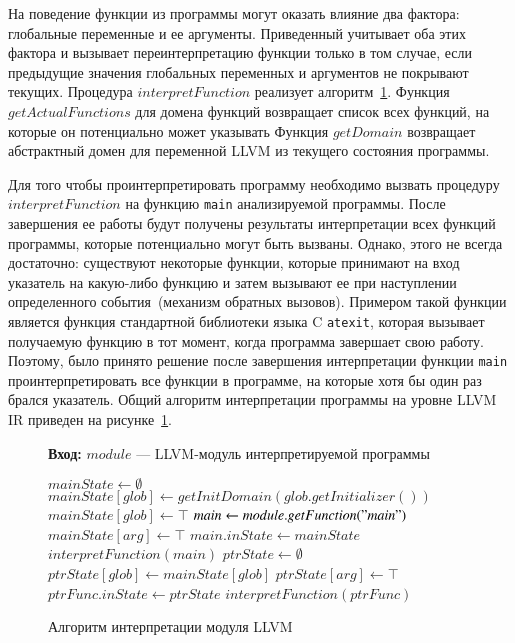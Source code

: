 На поведение функции из программы могут оказать влияние два фактора: 
глобальные переменные и ее аргументы. Приведенный учитывает оба этих фактора
и вызывает переинтерпретацию функции только в том случае, если предыдущие
значения глобальных переменных и аргументов не покрывают текущих. Процедура 
$interpretFunction$ реализует алгоритм~\ref{image:functionInterpretation}. 
Функция $getActualFunctions$ для домена функций возвращает список всех 
функций, на которые он потенциально может указывать Функция $getDomain$ 
возвращает абстрактный домен для переменной LLVM из текущего состояния 
программы.

Для того чтобы проинтерпретировать программу необходимо вызвать процедуру 
$interpretFunction$ на функцию \texttt{main} анализируемой программы. После 
завершения ее работы будут получены результаты интерпретации всех функций
программы, которые потенциально могут быть вызваны. Однако, этого не всегда
достаточно: существуют некоторые функции, которые принимают на вход указатель
на какую-либо функцию и затем вызывают ее при наступлении определенного 
события~(механизм обратных вызовов). Примером такой функции является функция
стандартной библиотеки языка C \texttt{atexit}, которая вызывает получаемую 
функцию в тот момент, когда программа завершает свою работу. Поэтому, было
принято решение после завершения интерпретации функции \texttt{main}
проинтерпретировать все функции в программе, на которые хотя бы один раз
брался указатель. Общий алгоритм интерпретации программы на уровне LLVM IR 
приведен на рисунке~\ref{image:functionInterpretation}.
\begin{figure}[h!]
\textbf{Вход:} $module$ --- LLVM-модуль интерпретируемой программы

\begin{algorithmic}[1]
\State $mainState \gets \emptyset$
        \State $mainState[glob] \gets getInitDomain(glob.getInitializer())$
    \Else
        \State $mainState[glob] \gets \top$
    \EndIf
\EndFor
\State $main \gets module.getFunction("main")$
    \State $mainState[arg] \gets \top$
\EndFor
\State $main.inState \gets mainState$
\State $interpretFunction(main)$
    \State $ptrState \gets \emptyset$
        \State $ptrState[glob] \gets mainState[glob]$
    \EndFor
        \State $ptrState[arg] \gets \top$
    \EndFor
    \State $ptrFunc.inState \gets ptrState$
    \State $interpretFunction(ptrFunc)$
\EndFor
\end{algorithmic}
\caption{Алгоритм интерпретации модуля LLVM}
\label{image:functionInterpretation}
\end{figure}

